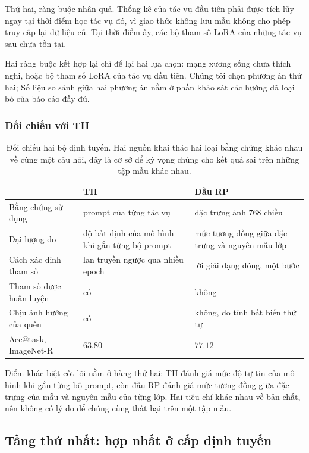 \documentclass[11pt,a4paper]{article}
\begin{document}
Thứ hai, ràng buộc nhân quả. Thống kê của tác vụ đầu tiên phải được tích lũy ngay
tại thời điểm học tác vụ đó, vì giao thức không lưu mẫu không cho phép truy cập
lại dữ liệu cũ. Tại thời điểm ấy, các bộ tham số LoRA của những tác vụ sau chưa
tồn tại.

Hai ràng buộc kết hợp lại chỉ để lại hai lựa chọn: mạng xương sống chưa thích
nghi, hoặc bộ tham số LoRA của tác vụ đầu tiên. Chúng tôi chọn phương án thứ hai;
Số liệu so sánh giữa hai phương án nằm ở phần khảo sát các hướng đã loại bỏ của báo cáo đầy đủ.

\subsubsection{Đối chiếu với TII}
\begin{table}[htbp]
\centering
\caption{Đối chiếu hai bộ định tuyến. Hai nguồn khai thác hai loại bằng chứng
khác nhau về cùng một câu hỏi, đây là cơ sở để kỳ vọng chúng cho kết quả sai trên
những tập mẫu khác nhau.}
\label{tab:tii-vs-rp}
\begin{tabular}{@{}p{3.3cm}p{4.9cm}p{5.2cm}@{}}
\toprule
 & TII & Đầu RP \\
\midrule
Bằng chứng sử dụng
  & prompt của từng tác vụ
  & đặc trưng ảnh $768$ chiều \\
Đại lượng đo
  & độ bất định của mô hình khi gắn từng bộ prompt
  & mức tương đồng giữa đặc trưng và nguyên mẫu lớp \\
Cách xác định tham số
  & lan truyền ngược qua nhiều epoch
  & lời giải dạng đóng, một bước \\
Tham số được huấn luyện
  & có
  & không \\
Chịu ảnh hưởng của quên
  & có
  & không, do tính bất biến thứ tự \\
Acc@task, ImageNet-R
  & $63.80$
  & $77.12$ \\
\bottomrule
\end{tabular}
\end{table}

Điểm khác biệt cốt lõi nằm ở hàng thứ hai: TII đánh giá mức độ tự tin của mô hình
khi gắn từng bộ prompt, còn đầu RP đánh giá mức tương đồng giữa đặc trưng của mẫu
và nguyên mẫu của từng lớp. Hai tiêu chí khác nhau về bản chất, nên không có lý
do để chúng cùng thất bại trên một tập mẫu.

\subsection{Tầng thứ nhất: hợp nhất ở cấp định tuyến}
\label{sec:stage1}
\end{document}
